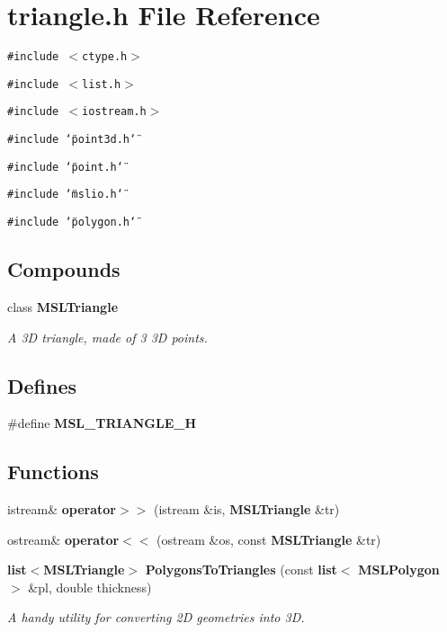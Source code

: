 \section{triangle.h File Reference}
\label{triangle_8h}
{\tt \#include $<$ctype.h$>$}\par
{\tt \#include $<$list.h$>$}\par
{\tt \#include $<$iostream.h$>$}\par
{\tt \#include \char`\"{}point3d.h\char`\"{}}\par
{\tt \#include \char`\"{}point.h\char`\"{}}\par
{\tt \#include \char`\"{}mslio.h\char`\"{}}\par
{\tt \#include \char`\"{}polygon.h\char`\"{}}\par
\subsection*{Compounds}
\begin{CompactItemize}
\item 
class {\bf MSLTriangle}
\begin{CompactList}\small\item\em A 3D triangle, made of 3 3D points.\item\end{CompactList}\end{CompactItemize}
\subsection*{Defines}
\begin{CompactItemize}
\item 
\#define {\bf MSL\_\-TRIANGLE\_\-H}
\end{CompactItemize}
\subsection*{Functions}
\begin{CompactItemize}
\item 
istream\& {\bf operator$>$$>$} (istream \&is, {\bf MSLTriangle} \&tr)
\item 
ostream\& {\bf operator$<$$<$} (ostream \&os, const {\bf MSLTriangle} \&tr)
\item 
{\bf list}$<${\bf MSLTriangle}$>$ {\bf Polygons\-To\-Triangles} (const {\bf list}$<$ {\bf MSLPolygon} $>$ \&pl, double thickness)
\begin{CompactList}\small\item\em A handy utility for converting 2D geometries into 3D.\item\end{CompactList}\end{CompactItemize}


